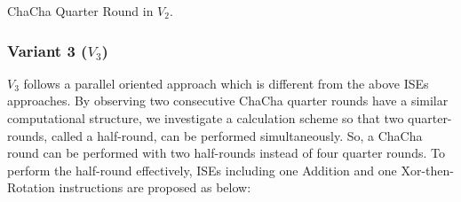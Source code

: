 \begin{algorithm}
	\BlankLine
	\caption{ChaCha Quarter Round in $V_2$.}
	\label{alg::qr::v3}
\end{algorithm}

\subsubsection{Variant 3 ($V_3$)}
$V_3$ follows a parallel oriented approach which is different from the above ISEs approaches. By observing two consecutive ChaCha quarter rounds have a similar computational structure, we investigate a calculation scheme so that two quarter-rounds, called a half-round, can be performed simultaneously. So, a ChaCha round can be performed with two half-rounds instead of four quarter rounds. To perform the half-round effectively, ISEs including one Addition and one Xor-then-Rotation instructions are proposed as below:   

